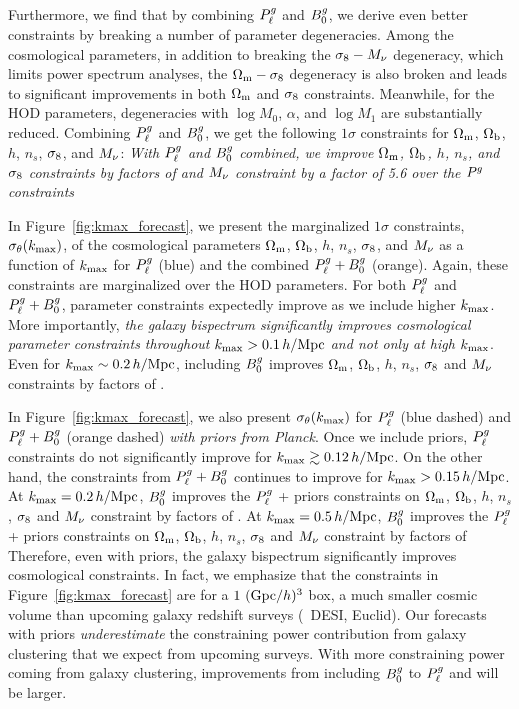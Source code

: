 Furthermore, we find that by combining $P^g_{\ell}$ and $B^g_0$, we derive even better
constraints by breaking a number of parameter degeneracies. Among the cosmological 
parameters, in addition to breaking the $\sigma_8 - M_\nu$ degeneracy, which limits
power spectrum analyses, the $\Omega_{\rm m}-\sigma_8$ degeneracy is also broken and leads to
significant improvements in both $\Omega_{\rm m}$ and 
$\sigma_8$ constraints. Meanwhile, for the HOD parameters, degeneracies with 
$\log M_0$, $\alpha$, and $\log M_1$ are substantially reduced. 
Combining $P^g_{\ell}$ and $B^g_0$, we get the following $1\sigma$ constraints for 
 $\Omega_{\rm m}$, $\Omega_{\rm b}$, $h$, $n_s$, $\sigma_8$, and $M_\nu$: 
{\em With $P^g_{\ell}$ and $B^g_0$ combined, we improve $\Omega_{\rm m}$, $\Omega_{\rm b}$, $h$,
$n_s$, and $\sigma_8$ constraints by factors of 
and $M_\nu$ constraint by a factor of 5.6 over the $P^g$ constraints}

In Figure~\ref{fig:kmax_forecast}, we present the marginalized $1\sigma$
constraints, $\sigma_\theta(k_{\rm max})$, of the cosmological parameters $\Omega_{\rm m}$,
$\Omega_{\rm b}$, $h$, $n_s$, $\sigma_8$, and $M_\nu$ as a function of $k_{\rm max}$ for $P^g_{\ell}$
(blue) and the combined $P^g_{\ell} + B^g_0$ (orange). Again, these constraints are
marginalized over the \cite{zheng2007} HOD parameters. For both $P^g_{\ell}$ and
$P^g_{\ell} + B^g_0$, parameter constraints expectedly improve as
we include higher $k_{\rm max}$. More importantly, {\em the galaxy bispectrum significantly 
improves cosmological parameter constraints throughout $k_{\rm max} > 0.1\,h/\mathrm{Mpc}$
and not only at high $k_{\rm max}$}. Even for $k_{\rm max}\sim 0.2\,h/\mathrm{Mpc}$, including 
$B^g_0$ improves $\Omega_{\rm m}$, $\Omega_{\rm b}$, $h$, $n_s$, $\sigma_8$ and $M_\nu$ constraints by 
factors of .

In Figure~\ref{fig:kmax_forecast}, we also present $\sigma_\theta(k_{\rm max})$ for
$P^g_{\ell}$ (blue dashed) and $P^g_{\ell} + B^g_0$ 
(orange dashed) {\em with priors from Planck}. Once we include \planck priors,
$P^g_{\ell}$ constraints do not significantly improve for $k_{\rm max} \gtrsim 0.12\,h/\mathrm{Mpc}$.
On the other hand, the constraints from $P^g_{\ell} + B^g_0$ continues to improve for $k_{\rm max} > 0.15\,h/\mathrm{Mpc}$. 
At $k_{\rm max}=0.2\,h/\mathrm{Mpc}$, $B^g_0$ improves the $P^g_{\ell}$ + \planck priors constraints on  
$\Omega_{\rm m}$, $\Omega_{\rm b}$, $h$, $n_s$, $\sigma_8$ and $M_\nu$ constraint by factors of
.
At $k_{\rm max} = 0.5\,h/\mathrm{Mpc}$, $B^g_0$ improves the $P^g_{\ell}$ + \planck priors constraints on  
$\Omega_{\rm m}$, $\Omega_{\rm b}$, $h$, $n_s$, $\sigma_8$ and $M_\nu$ constraint by factors of 
Therefore, even with \planck priors, the galaxy bispectrum significantly improves cosmological 
constraints. In fact, we emphasize that the constraints in Figure~\ref{fig:kmax_forecast} 
are for a $1~({\rm Gpc}/h)^3$ box, a much smaller cosmic volume than upcoming
galaxy redshift surveys (\eg~DESI, Euclid). Our forecasts with \planck priors
{\em underestimate} the constraining power contribution from galaxy clustering 
that we expect from upcoming surveys.  With more constraining power coming 
from galaxy clustering, improvements from including $B^g_0$ to $P^g_{\ell}$ and \planck
will be larger.

